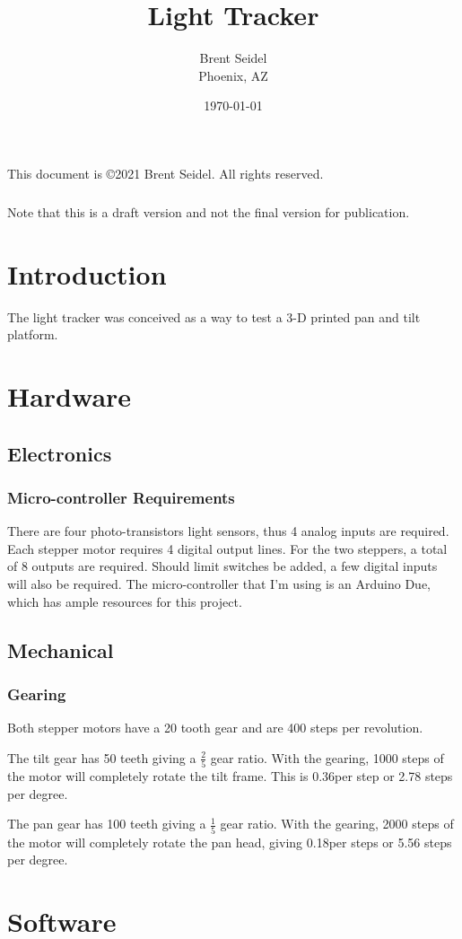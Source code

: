 \documentclass[10pt, openany]{book}
\title{Light Tracker}
\author{Brent Seidel \\ Phoenix, AZ}
\date{ \today }
\begin{document}
%
%
\frontmatter
\maketitle
\begin{center}
This document is \copyright 2021 Brent Seidel.  All rights reserved.

\paragraph{}Note that this is a draft version and not the final version for publication.
\end{center}
\tableofcontents

\mainmatter
\chapter{Introduction}
The light tracker was conceived as a way to test a 3-D printed pan and tilt platform.

\chapter{Hardware}
\section{Electronics}
\subsection{Micro-controller Requirements}
There are four photo-transistors light sensors, thus 4 analog inputs are required.  Each stepper motor requires 4 digital output lines.  For the two steppers, a total of 8 outputs are required.  Should limit switches be added, a few digital inputs will also be required.  The micro-controller that I'm using is an Arduino Due, which has ample resources for this project.

\section{Mechanical}
\subsection{Gearing}
Both stepper motors have a 20 tooth gear and are 400 steps per revolution.

The tilt gear has 50 teeth giving a $\frac{2}{5}$ gear ratio.  With the gearing, 1000 steps of the motor will completely rotate the tilt frame.  This is 0.36\degree per step or 2.78 steps per degree.

The pan gear has 100 teeth giving a $\frac{1}{5}$ gear ratio.  With the gearing, 2000 steps of the motor will completely rotate the pan head, giving 0.18\degree per steps or 5.56 steps per degree.

\chapter{Software}
\end{document}
